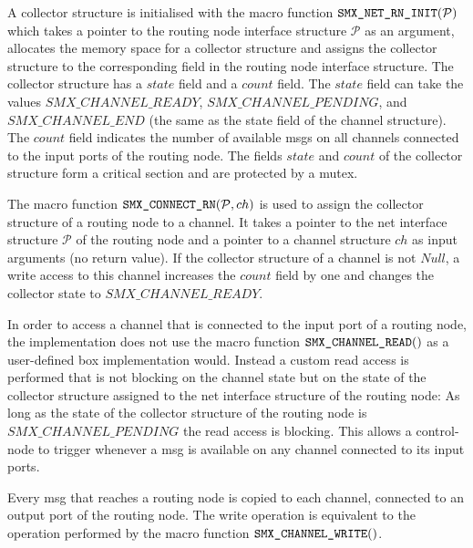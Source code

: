 A collector structure is initialised with the macro function $\textnormal{\tt SMX\_NET\_RN\_INIT}(\mathcal{P})$ which takes a pointer to the routing node interface structure $\mathcal{P}$ as an argument, allocates the memory space for a collector structure and assigns the collector structure to the corresponding field in the routing node interface structure.
The collector structure has a $state$ field and a $count$ field.
The $state$ field can take the values $\mathit{SMX\_CHANNEL\_READY}$, $\mathit{SMX\_CHANNEL\_PENDING}$, and $\mathit{SMX\_CHANNEL\_END}$ (the same as the state field of the channel structure).
The $count$ field indicates the number of available \glspl*{msg} on all channels connected to the input ports of the routing node.
The fields $state$ and $count$ of the collector structure form a critical section and are protected by a mutex.

The macro function $\textnormal{\tt SMX\_CONNECT\_RN}(\mathcal{P}, ch)$ is used to assign the collector structure of a routing node to a channel.
It takes a pointer to the net interface structure $\mathcal{P}$ of the routing node and a pointer to a channel structure $ch$ as input arguments (no return value).
If the collector structure of a channel is not $Null$, a write access to this channel increases the $count$ field by one and changes the collector state to $\mathit{SMX\_CHANNEL\_READY}$.

In order to access a channel that is connected to the input port of a routing node, the implementation does not use the macro function $\textnormal{\tt SMX\_CHANNEL\_READ}()$ as a user-defined box implementation would.
Instead a custom read access is performed that is not blocking on the channel state but on the state of the collector structure assigned to the net interface structure of the routing node:
As long as the state of the collector structure of the routing node is $\mathit{SMX\_CHANNEL\_PENDING}$ the read access is blocking.
This allows a control-node to trigger whenever a \gls*{msg} is available on any channel connected to its input ports.

Every \gls*{msg} that reaches a routing node is copied to each channel, connected to an output port of the routing node.
The write operation is equivalent to the operation performed by the macro function $\textnormal{\tt SMX\_CHANNEL\_WRITE}()$.

